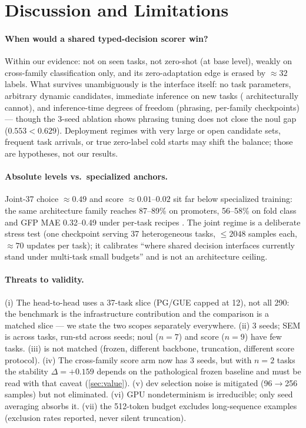 \section{Discussion and Limitations}
\label{sec:discussion}

\paragraph{When would a shared typed-decision scorer win?}
Within our evidence: not on seen tasks, not zero-shot (at base level), weakly on
cross-family classification only, and its zero-adaptation edge is erased by ${\approx}32$
labels. What survives unambiguously is the interface itself: no task parameters, arbitrary
dynamic candidates, immediate inference on new tasks ( architecturally cannot), and
inference-time degrees of freedom (phrasing, per-family checkpoints) --- though the 3-seed
ablation shows phrasing tuning does not close the noul gap ($0.553<0.629$). Deployment
regimes with very large or open candidate sets, frequent task arrivals, or true
zero-label cold starts may shift the balance; those are hypotheses, not our results.

\paragraph{Absolute levels vs.\ specialized anchors.}
Joint-37 choice ${\approx}0.49$ and score ${\approx}0.01$--$0.02$ sit far below
specialized training: the same architecture family reaches 87--89\% on promoters, 56--58\%
on fold class and GFP MAE 0.32--0.49 under per-task recipes \citep{wang2024llamagene}. The
joint regime is a deliberate stress test (one checkpoint serving 37 heterogeneous tasks,
$\le2048$ samples each, ${\approx}70$ updates per task); it calibrates ``where shared
decision interfaces currently stand under multi-task small budgets'' and is not an
architecture ceiling.

\paragraph{Threats to validity.}
(i) The head-to-head uses a 37-task slice (PG/GUE capped at 12), not all 290: the benchmark
is the infrastructure contribution and the comparison is a matched slice --- we state the
two scopes separately everywhere. (ii) 3 seeds; SEM is across tasks, run-std across seeds;
noul ($n{=}7$) and score ($n{=}9$) have few tasks. (iii)  is not matched (frozen,
different backbone, truncation, different score protocol). (iv) The cross-family score arm
now has 3 seeds, but with $n{=}2$ tasks the stability $\Delta=+0.159$ depends on the
pathological frozen baseline and must be read with that caveat (\cref{sec:value}). (v) dev
selection noise is mitigated (96$\to$256 samples) but not eliminated. (vi) GPU
nondeterminism is irreducible; only seed averaging absorbs it. (vii) the 512-token budget
excludes long-sequence examples (exclusion rates reported, never silent truncation).

